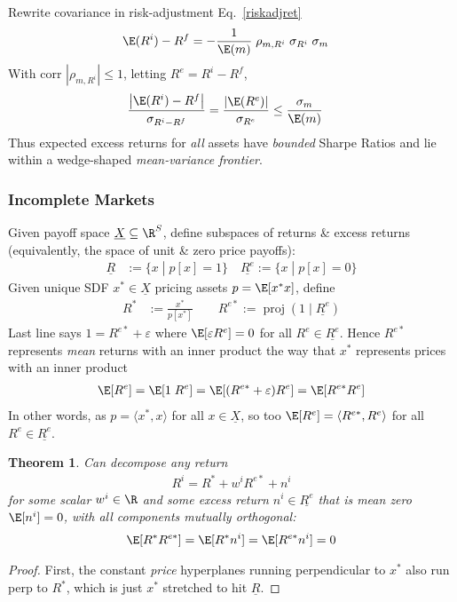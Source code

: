 \documentclass[12pt]{article}
\theoremstyle{plain}
\newtheorem{thm}{Theorem}[section]
\theoremstyle{definition}
\theoremstyle{remark}
\newcommand{\proj}{\operatorname{proj}}
\begin{document}
\begin{multicols*}{2}
Rewrite covariance in risk-adjustment Eq.~\ref{riskadjret}
\begin{align*}
  \E(R^i) - R^f
  &= -\frac{1}{\E(m)} \; \rho_{m,R^i} \; \sigma_{R^i} \; \sigma_m
\end{align*}
With corr $|\rho_{m,R^i}|\leq 1$,
letting $R^e=R^i-R^f$,
\begin{align*}
  \frac{\left\lvert\E(R^i) - R^f\right\rvert}{\sigma_{R^i-R^f}}
  =
  \frac{\left\lvert\E(R^e)\right\rvert}{\sigma_{R^e}}
  &\leq \frac{\sigma_m}{\E(m)}
\end{align*}
Thus expected excess returns for \emph{all} assets have \emph{bounded}
Sharpe Ratios and lie within a wedge-shaped
\emph{mean-variance frontier}.

\subsubsection{Incomplete Markets}

Given payoff space $\underline{X}\subseteq\R^S$, define subspaces of
returns \& excess returns (equivalently, the space of unit \& zero price
payoffs):
\begin{align*}
  \underline{R}
  &:=\{x\;|\; p[x]=1\}
  \quad
  \underline{R^e}
  :=\{x\;|\; p[x]=0\}
\end{align*}
Given unique SDF $x^*\in\underline{X}$ pricing assets $p=\E[x^*x]$,
define
\begin{align*}
  R^* &:=
  \frac{x^*}{p[x^*]}
  \qquad
  R^{e*} :=
  \proj(1\;|\;\underline{R^e})
\end{align*}
Last line says $1 = R^{e*} + \varepsilon$ where
$\E[\varepsilon R^e]=0$ for all $R^e\in\underline{R^e}$.
Hence $R^{e*}$ represents \emph{mean} returns with an inner product the
way that $x^*$ represents prices with an inner product
\begin{align*}
  \E[R^e]
  =
  \E[1 \; R^e ]
  =
  \E[(R^{e*}+\varepsilon)R^e]
  =
  \E[R^{e*}R^e]
\end{align*}
In other words, as $p=\langle x^*, x \rangle$ for all
$x\in\underline{X}$, so too
$\E[R^e]=\langle R^{e*}, R^e \rangle$ for all $R^e\in\underline{R^e}$.

\begin{thm}
Can decompose any return
\begin{align*}
  R^i = R^* + w^i R^{e*} + n^i
\end{align*}
for some scalar $w^i\in\R$ and some excess return
$n^i\in\underline{R^e}$ that is mean zero $\E[n^i]=0$, with
all components mutually orthogonal:
\begin{align*}
  \E[R^*R^{e*}]
  =
  \E[R^*n^i]
  =
  \E[R^{e*}n^i]
  = 0
\end{align*}
\end{thm}
\begin{proof}
First, the constant \emph{price} hyperplanes running perpendicular to
$x^*$ also run perp to $R^*$, which is just $x^*$ stretched to hit
$\underline{R}$.


\end{proof}
\end{multicols*}
\end{document}
